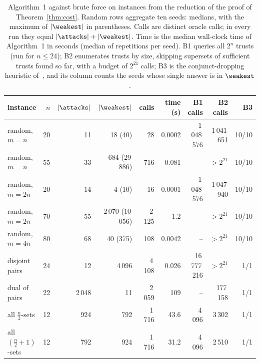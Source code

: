 \begin{table}[t]
\caption{Algorithm~1 against brute force on instances from the reduction of
the proof of Theorem~\ref{thm:cost}. Random rows aggregate ten seeds: medians, with the maximum
of $|\weakest|$ in parentheses. Calls are distinct oracle calls; in every run they
equal $|\attacks|+|\weakest|$. Time is the median wall-clock time of Algorithm~1 in
seconds (median of repetitions per seed). B1 queries all $2^n$ trusts (run for $n \le
24$); B2 enumerates trusts by size, skipping supersets of sufficient trusts found so
far, with a budget of $2^{21}$ calls; B3 is the conjunct-dropping heuristic of~\cite{rowe}, and
its column counts the seeds whose single answer is in $\weakest$.}
\label{tab:scale}
\centering
\setlength{\tabcolsep}{2.4pt}
\footnotesize
\begin{tabular}{lrrrrrrrr}
\toprule
instance & $n$ & $|\attacks|$ & $|\weakest|$ & calls & time (s) & B1 calls & B2 calls & B3\\
\midrule
random, $m=n$                & 20 & 11 & 18 (40) & 28 & 0.0002 & 1\,048\,576 & 1\,041\,651 & 10/10\\
random, $m=n$                & 55 & 33 & 684 (29\,886) & 716 & 0.081 & -- & $>2^{21}$ & 10/10\\
random, $m=2n$               & 20 & 14 & 4 (10) & 16 & 0.0001 & 1\,048\,576 & 1\,047\,940 & 10/10\\
random, $m=2n$               & 70 & 55 & 2\,070 (10\,056) & 2\,125 & 1.2 & -- & $>2^{21}$ & 10/10\\
random, $m=4n$               & 80 & 68 & 40 (375) & 108 & 0.0042 & -- & $>2^{21}$ & 10/10\\
disjoint pairs               & 24 & 12 & 4\,096 & 4\,108 & 0.026 & 16\,777\,216 & $>2^{21}$ & 1/1\\
dual of pairs                & 22 & 2\,048 & 11 & 2\,059 & 109 & -- & 177\,158 & 1/1\\
all $\frac{n}{2}$-sets       & 12 & 924 & 792 & 1\,716 & 43.6 & 4\,096 & 3\,302 & 1/1\\
all $(\frac{n}{2}{+}1)$-sets & 12 & 792 & 924 & 1\,716 & 31.2 & 4\,096 & 2\,510 & 1/1\\
\bottomrule
\end{tabular}
\end{table}
